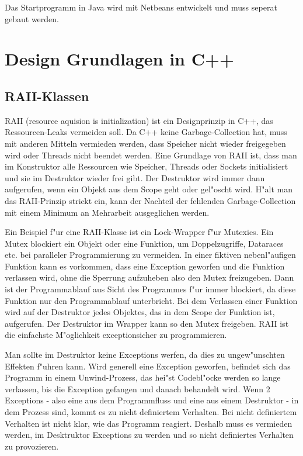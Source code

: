 \documentclass[14pt, a4paper]{report}
\begin{document}
Das Startprogramm in Java wird mit Netbeans entwickelt und muss seperat gebaut werden.

\chapter{Design Grundlagen in C++}
\section{RAII-Klassen} \label{RAII}
RAII (resource aquision is initialization) ist ein Designprinzip in C++, das 
Ressourcen-Leaks vermeiden soll. Da C++ keine Garbage-Collection hat, muss mit
anderen Mitteln vermieden werden, 
dass Speicher nicht wieder freigegeben wird oder Threads  nicht
beendet werden. Eine Grundlage von RAII ist, dass man im Konstruktor alle Ressourcen
wie Speicher, Threads oder Sockets initialisiert und sie im Destruktor wieder frei gibt.
Der Destruktor wird immer dann aufgerufen, wenn ein Objekt aus dem Scope geht oder
gel"oscht wird. H"alt man das RAII-Prinzip strickt ein, kann der Nachteil der fehlenden
Garbage-Collection mit einem Minimum an Mehrarbeit ausgeglichen werden. 

Ein Beispiel f"ur eine RAII-Klasse ist ein Lock-Wrapper f"ur Mutexies. Ein Mutex blockiert ein Objekt
oder eine Funktion, um Doppelzugriffe, Dataraces etc. bei paralleler Programmierung
zu vermeiden. 
In einer fiktiven nebenl"aufigen Funktion kann es vorkommen, dass eine Exception geworfen und die
Funktion verlassen wird, ohne die Sperrung aufzuheben also den Mutex freizugeben. 
Dann ist der Programmablauf 
aus Sicht des Programmes f"ur immer blockiert, da diese Funktion nur den Programmablauf
unterbricht. Bei dem Verlassen einer Funktion wird auf der Destruktor jedes Objektes, das
in dem Scope der Funktion ist, aufgerufen. Der Destruktor im Wrapper kann so den Mutex freigeben.
RAII ist die einfachste M"oglichkeit exceptionsicher zu programmieren. 

Man sollte im Destruktor keine Exceptions werfen, da dies zu ungew"unschten Effekten 
f"uhren kann. Wird generell eine Exception geworfen, befindet sich das Programm in einem
Unwind-Prozess, das hei"st Codebl"ocke werden so lange verlassen, bis die Exception
gefangen und danach behandelt wird. Wenn 2 Exceptions - also eine aus
dem Programmfluss und eine aus einem Destruktor - in dem Prozess sind, kommt es zu nicht
definiertem Verhalten. Bei nicht definiertem Verhalten ist nicht klar, wie das Programm 
reagiert. Deshalb muss es vermieden werden, im Desktruktor Exceptions zu werden und so
nicht definiertes Verhalten zu provozieren.
\newpage
\end{document}

